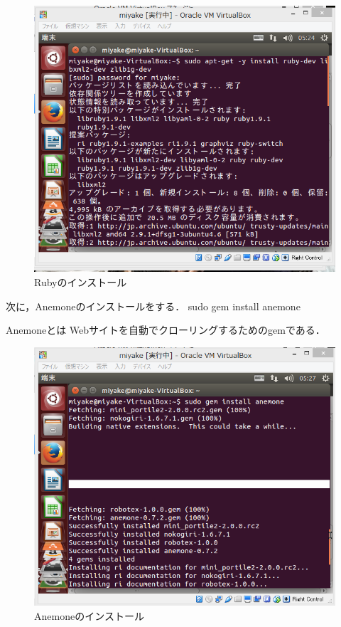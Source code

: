 \begin{figure}[H]
\centering
\includegraphics[width=15cm]{rubyins.PNG}
\caption{Rubyのインストール}\label{サンプル図}
\end{figure}


次に，Anemoneのインストールをする．
sudo gem install anemone

Anemoneとは
Webサイトを自動でクローリングするためのgemである．


\begin{figure}[H]
\centering
\includegraphics[width=15cm]{anemoneins.PNG}
\caption{Anemoneのインストール}\label{サンプル図}
\end{figure}




